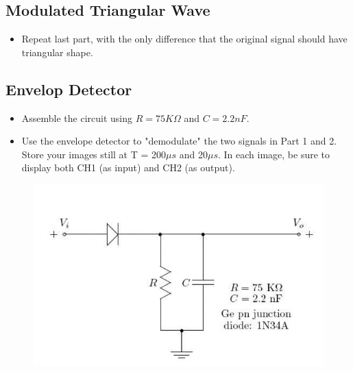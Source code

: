 \documentclass[12pt]{article}
\begin{document}
\subsection{Modulated Triangular Wave}
\begin{itemize}
\item Repeat last part, with the only difference that the original signal should have triangular shape.
\end{itemize}
\subsection{Envelop Detector}
\begin{itemize}
\item Assemble the circuit using $R=75K\Omega$ and $C=2.2nF$.
\item Use the envelope detector to "demodulate" the two signals in Part 1 and 2. Store your images still at
T = 200$\mu s$ and 20$\mu s$. In each image, be sure to display both CH1 (as input) and CH2 (as output).
\end{itemize}
\begin{figure}[H]
\centering
\includegraphics[scale=0.5]{P10.jpg}
\end{figure}
\end{document}
